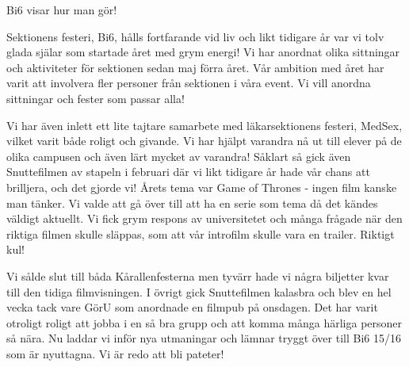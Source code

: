 \begin{news}{3}{Bi6 visar hur man gör!}{}{}{}


Sektionens festeri, Bi6, hålls fortfarande vid liv och likt tidigare år var
vi tolv glada själar som startade året med grym energi! Vi har anordnat olika
sittningar och aktiviteter för sektionen sedan maj förra året. Vår ambition med
året har varit att involvera fler personer från sektionen i våra event. Vi vill
anordna sittningar och fester som passar alla! 

Vi har även inlett ett lite
tajtare samarbete med läkarsektionens festeri, MedSex, vilket varit både roligt
och givande. Vi har hjälpt varandra nå ut till elever på de olika campusen och
även lärt mycket av varandra! Såklart så gick även Snuttefilmen av stapeln i
februari där vi likt tidigare år hade vår chans att brilljera, och det gjorde
vi! Årets tema var Game of Thrones - ingen film kanske man tänker. Vi valde att
gå över till att ha en serie som tema då det kändes väldigt aktuellt. Vi fick
grym respons av universitetet och många frågade när den riktiga filmen skulle
släppas, som att vår introfilm skulle vara en trailer. Riktigt kul!

Vi sålde slut till båda Kårallenfesterna men tyvärr hade vi några biljetter 
kvar till den tidiga filmvisningen. I övrigt gick Snuttefilmen kalasbra och 
blev en hel vecka tack vare GörU som anordnade en filmpub på onsdagen. Det har 
varit otroligt roligt att jobba i en så bra grupp och att komma många härliga
personer så nära. Nu laddar vi inför nya utmaningar och lämnar tryggt över till
Bi6 15/16 som är nyuttagna. Vi är redo att bli pateter!

\end{news}
